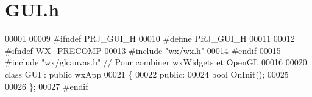 \section{G\+U\+I.\+h}
\label{_g_u_i_8h_source}

\begin{DoxyCode}
00001 
00009 \textcolor{preprocessor}{#ifndef PRJ\_GUI\_H}
00010 \textcolor{preprocessor}{#define PRJ\_GUI\_H}
00011 
00012 \textcolor{preprocessor}{#ifndef WX\_PRECOMP}
00013 \textcolor{preprocessor}{#include "wx/wx.h"}
00014 \textcolor{preprocessor}{#endif}
00015 \textcolor{preprocessor}{#include "wx/glcanvas.h"} \textcolor{comment}{// Pour combiner wxWidgets et OpenGL}
00016 
00020 \textcolor{keyword}{class }GUI : \textcolor{keyword}{public} wxApp
00021 \{
00022     \textcolor{keyword}{public}:
00024     \textcolor{keywordtype}{bool} OnInit();
00025 
00026 \};
00027 \textcolor{preprocessor}{#endif }
\end{DoxyCode}
